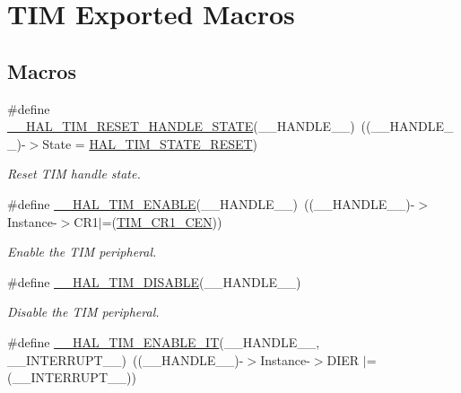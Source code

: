 \hypertarget{group___t_i_m___exported___macros}{\section{T\-I\-M Exported Macros}
\label{group___t_i_m___exported___macros}
}
\subsection*{Macros}
\begin{DoxyCompactItemize}
\item 
\#define \hyperlink{group___t_i_m___exported___macros_gace20fd4e38231b9682fbc83a80ec19a3}{\-\_\-\-\_\-\-H\-A\-L\-\_\-\-T\-I\-M\-\_\-\-R\-E\-S\-E\-T\-\_\-\-H\-A\-N\-D\-L\-E\-\_\-\-S\-T\-A\-T\-E}(\-\_\-\-\_\-\-H\-A\-N\-D\-L\-E\-\_\-\-\_\-)~((\-\_\-\-\_\-\-H\-A\-N\-D\-L\-E\-\_\-\-\_\-)-\/$>$State = \hyperlink{group___t_i_m___exported___types_ggae0994cf5970e56ca4903e9151f40010ca28011b79e60b74a6c55947c505c51cbc}{H\-A\-L\-\_\-\-T\-I\-M\-\_\-\-S\-T\-A\-T\-E\-\_\-\-R\-E\-S\-E\-T})
\begin{DoxyCompactList}\small\item\em Reset T\-I\-M handle state. \end{DoxyCompactList}\item 
\#define \hyperlink{group___t_i_m___exported___macros_ga1a90544705059e9f19f991651623b0c0}{\-\_\-\-\_\-\-H\-A\-L\-\_\-\-T\-I\-M\-\_\-\-E\-N\-A\-B\-L\-E}(\-\_\-\-\_\-\-H\-A\-N\-D\-L\-E\-\_\-\-\_\-)~((\-\_\-\-\_\-\-H\-A\-N\-D\-L\-E\-\_\-\-\_\-)-\/$>$Instance-\/$>$C\-R1$\vert$=(\hyperlink{group___peripheral___registers___bits___definition_ga93d86355e5e3b399ed45e1ca83abed2a}{T\-I\-M\-\_\-\-C\-R1\-\_\-\-C\-E\-N}))
\begin{DoxyCompactList}\small\item\em Enable the T\-I\-M peripheral. \end{DoxyCompactList}\item 
\#define \hyperlink{group___t_i_m___exported___macros_ga6a5e653e0e06a04151b74eb1a5f96eb6}{\-\_\-\-\_\-\-H\-A\-L\-\_\-\-T\-I\-M\-\_\-\-D\-I\-S\-A\-B\-L\-E}(\-\_\-\-\_\-\-H\-A\-N\-D\-L\-E\-\_\-\-\_\-)
\begin{DoxyCompactList}\small\item\em Disable the T\-I\-M peripheral. \end{DoxyCompactList}\item 
\#define \hyperlink{group___t_i_m___exported___macros_ga4d69943bc4716743c78e3194e259097e}{\-\_\-\-\_\-\-H\-A\-L\-\_\-\-T\-I\-M\-\_\-\-E\-N\-A\-B\-L\-E\-\_\-\-I\-T}(\-\_\-\-\_\-\-H\-A\-N\-D\-L\-E\-\_\-\-\_\-, \-\_\-\-\_\-\-I\-N\-T\-E\-R\-R\-U\-P\-T\-\_\-\-\_\-)~((\-\_\-\-\_\-\-H\-A\-N\-D\-L\-E\-\_\-\-\_\-)-\/$>$Instance-\/$>$D\-I\-E\-R $\vert$= (\-\_\-\-\_\-\-I\-N\-T\-E\-R\-R\-U\-P\-T\-\_\-\-\_\-))

\end{DoxyCompactItemize}
